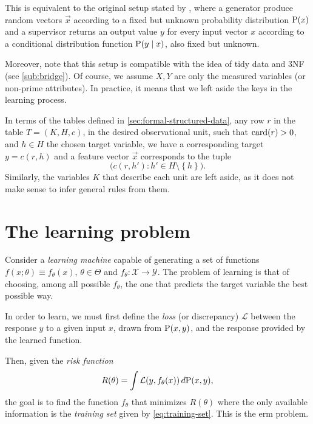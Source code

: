 This is equivalent to the original setup stated by \textcite{Vapnik1999b}, where
a generator produce random vectors $\vec{x}$ according to a fixed but unknown
probability distribution $\Prob(x)$ and a supervisor returns an output value $y$ for every
input vector $x$ according to a conditional distribution function $\Prob(y \mid x)$, also fixed but
unknown.

Moreover, note that this setup is compatible with the idea of tidy data and 3NF (see
\cref{sub:bridge}). Of course, we assume $X, Y$ are only the measured variables (or
non-prime attributes).  In practice, it means that we left aside the keys in the learning
process.

In terms of the tables defined in \cref{sec:formal-structured-data}, any row $r$ in the
table $T = (K, H, c)$, in the desired observational unit, such that $\rowcard[r] > 0$, and
$h \in H$ the chosen target variable, we have a corresponding target $y = c(r, h)$ and a
feature vector $\vec{x}$ corresponds to the tuple $$\big(c(r, h') : h' \in H \setminus
\left\{ h \right\}\big)\text{.}$$  Similarly, the variables $K$ that describe each unit
are left aside, as it does not make sense to infer general rules from them.

\section{The learning problem}

Consider a \emph{learning machine} capable of generating a set of functions $f(x;
\theta) \equiv f_\theta(x)$, $\theta \in \Theta$ and $f_\theta : \mathcal{X} \rightarrow \mathcal{Y}$.
The problem of learning is that of choosing, among all possible $f_\theta$, the one that
predicts the target variable the best possible way.

In order to learn, we must first define the \emph{loss} (or discrepancy) $\mathcal{L}$
between the response $y$ to a given input $x$, drawn from $\Prob(x, y)$, and the
response provided by the learned function.

Then, given the \emph{risk function}
\begin{equation}
  \label{eq:risk}
  R(\theta) = \int \mathcal{L}(y, f_\theta(x))\, d\!\Prob(x, y)\text{,}
\end{equation}
the goal is to find the function $f_\theta$ that minimizes $R(\theta)$
where the only available information is the \emph{training set} given by \eqref{eq:training-set}.
This is the \gls{erm} problem.

